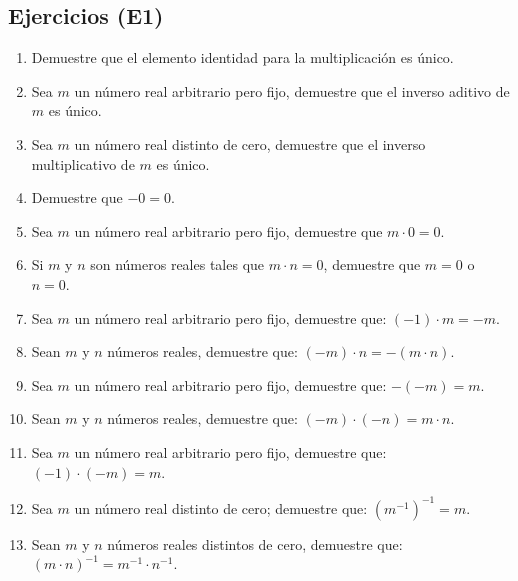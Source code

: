 \documentclass[11pt]{article}
\begin{document}
\subsection*{Ejercicios (E1)}
    \begin{enumerate}[label=(\alph*)]
        \item Demuestre que el elemento identidad para la multiplicación es único.
        \item Sea $m$ un número real arbitrario pero fijo, demuestre que el inverso aditivo de $m$ es único.
        \item Sea $m$ un número real distinto de cero, demuestre que el inverso multiplicativo de $m$ es único.
        \item Demuestre que $-0 = 0$.
        \item Sea $m$ un número real arbitrario pero fijo, demuestre que $m \cdot 0 = 0$.
        \item Si $m$ y $n$ son números reales tales que $ m \cdot n = 0 $, demuestre que $m=0$ o $n=0$.
        \item Sea $m$ un número real arbitrario pero fijo, demuestre que: $(-1) \cdot m =-m $.
        \item Sean $m$ y $n$ números reales, demuestre que: $ (-m) \cdot n = -(m \cdot n) $.
        \item Sea $m$ un número real arbitrario pero fijo, demuestre que: $-(-m)=m$.
        \item Sean $m$ y $n$ números reales, demuestre que: $ (-m) \cdot (-n) = m \cdot n $.
        \item Sea $m$ un número real arbitrario pero fijo, demuestre que: $(-1) \cdot (-m)=m$.
        \item Sea $m$ un número real distinto de cero; demuestre que: $\left( m^{-1} \right)^{-1}=m$.
        \item Sean $m$ y $n$ números reales distintos de cero, demuestre que: $(m \cdot n)^{-1}=m^{-1} \cdot n^{-1}$.
    \end{enumerate}
\end{document}
